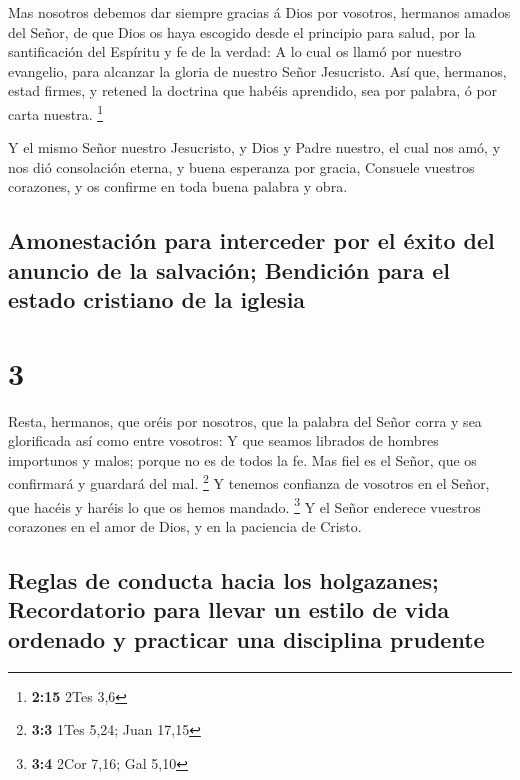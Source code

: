  Mas nosotros debemos dar siempre gracias á Dios por
vosotros, hermanos amados del Señor, de que Dios os haya escogido desde
el principio para salud, por la santificación del Espíritu y fe de la
verdad:  A lo cual os llamó por nuestro evangelio, para
alcanzar la gloria de nuestro Señor Jesucristo.  Así que,
hermanos, estad firmes, y retened la doctrina que habéis aprendido, sea
por palabra, ó por carta nuestra. \footnote{\textbf{2:15} 2Tes 3,6}

 Y el mismo Señor nuestro Jesucristo, y Dios y Padre
nuestro, el cual nos amó, y nos dió consolación eterna, y buena
esperanza por gracia,  Consuele vuestros corazones, y os
confirme en toda buena palabra y obra.

\hypertarget{amonestaciuxf3n-para-interceder-por-el-uxe9xito-del-anuncio-de-la-salvaciuxf3n-bendiciuxf3n-para-el-estado-cristiano-de-la-iglesia}{%
\subsection{Amonestación para interceder por el éxito del anuncio de la
salvación; Bendición para el estado cristiano de la
iglesia}\label{amonestaciuxf3n-para-interceder-por-el-uxe9xito-del-anuncio-de-la-salvaciuxf3n-bendiciuxf3n-para-el-estado-cristiano-de-la-iglesia}}

\hypertarget{section-2}{%
\section{3}\label{section-2}}

 Resta, hermanos, que oréis por nosotros, que la palabra
del Señor corra y sea glorificada así como entre vosotros:
 Y que seamos librados de hombres importunos y malos;
porque no es de todos la fe.  Mas fiel es el Señor, que os
confirmará y guardará del mal. \footnote{\textbf{3:3} 1Tes 5,24; Juan
  17,15}  Y tenemos confianza de vosotros en el Señor, que
hacéis y haréis lo que os hemos mandado. \footnote{\textbf{3:4} 2Cor
  7,16; Gal 5,10}  Y el Señor enderece vuestros corazones
en el amor de Dios, y en la paciencia de Cristo.

\hypertarget{reglas-de-conducta-hacia-los-holgazanes-recordatorio-para-llevar-un-estilo-de-vida-ordenado-y-practicar-una-disciplina-prudente}{%
\subsection{Reglas de conducta hacia los holgazanes; Recordatorio para
llevar un estilo de vida ordenado y practicar una disciplina
prudente}\label{reglas-de-conducta-hacia-los-holgazanes-recordatorio-para-llevar-un-estilo-de-vida-ordenado-y-practicar-una-disciplina-prudente}}

